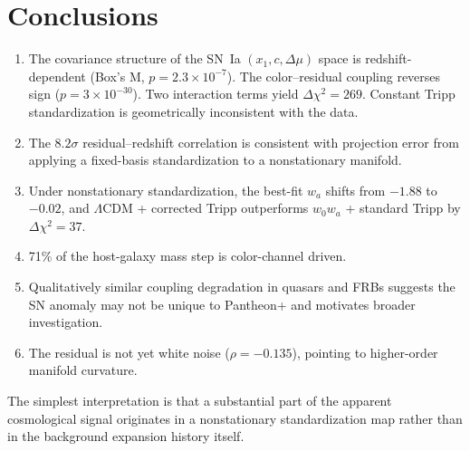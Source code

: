 \documentclass[twocolumn,showpacs,preprintnumbers,amsmath,amssymb,prl]{revtex4-2}
\begin{document}
\section{Conclusions}
\label{sec:conclusions}

\begin{enumerate}

\item The covariance structure of the SN~Ia $(x_1, c, \Delta\mu)$ space is redshift-dependent (Box's M, $p = 2.3 \times 10^{-7}$). The color--residual coupling reverses sign ($p = 3 \times 10^{-30}$). Two interaction terms yield $\Delta\chi^2 = 269$. Constant Tripp standardization is geometrically inconsistent with the data.

\item The $8.2\sigma$ residual--redshift correlation is consistent with projection error from applying a fixed-basis standardization to a nonstationary manifold.

\item Under nonstationary standardization, the best-fit $w_a$ shifts from $-1.88$ to $-0.02$, and $\Lambda$CDM + corrected Tripp outperforms $w_0 w_a$ + standard Tripp by $\Delta\chi^2 = 37$.

\item 71\% of the host-galaxy mass step is color-channel driven.

\item Qualitatively similar coupling degradation in quasars and FRBs suggests the SN anomaly may not be unique to Pantheon+ and motivates broader investigation.

\item The residual is not yet white noise ($\rho = -0.135$), pointing to higher-order manifold curvature.

\end{enumerate}

The simplest interpretation is that a substantial part of the apparent cosmological signal originates in a nonstationary standardization map rather than in the background expansion history itself.
\end{document}
